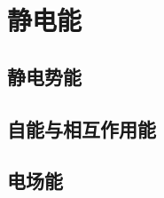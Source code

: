 

\section{静电能}\label{15-3}

\subsection{静电势能}\label{15-3-1}

\subsection{自能与相互作用能}\label{15-3-2}

\subsection{电场能}\label{15-3-3}